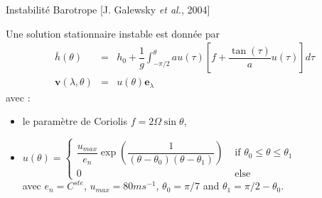 \documentclass[11pt]{beamer}
\def\gint{\displaystyle\int}
\begin{document}

\begin{frame}{Instabilité Barotrope [J. Galewsky \textit{et al.}, 2004]}

\begin{exampleblock}{}
Une solution stationnaire instable est donnée par
\begin{equation}
\begin{array}{rcl}
\bar{h}(\theta) & = & h_0 + \dfrac{1}{g}\gint^{\theta}_{-\pi/2} a u(\tau) \left[ f + \dfrac{\tan(\tau)}{a} u(\tau) \right] d \tau \\
\mathbf{v}(\lambda,\theta) & = & u(\theta) \mathbf{e}_{\lambda}
\end{array}
\end{equation}
avec :
\begin{itemize}
\item le paramètre de Coriolis $f = 2 \Omega \sin \theta$,
\item $u(\theta)=\left\lbrace
\begin{array}{ll}
\dfrac{u_{max}}{e_n} \exp\left( \dfrac{1}{(\theta-\theta_0)(\theta-\theta_1)} \right) & \text{ if } \theta_0 \leq \theta \leq \theta_1 \\
0 & \text{ else}
\end{array}\right.$\\
 avec $e_n=C^{ste}$, $u_{max} = 80 ms^{-1}$, $\theta_0 = \pi/7$ and $\theta_1 = \pi/2 - \theta_0$.
\end{itemize}
\end{exampleblock}
\end{frame}


\end{document}
